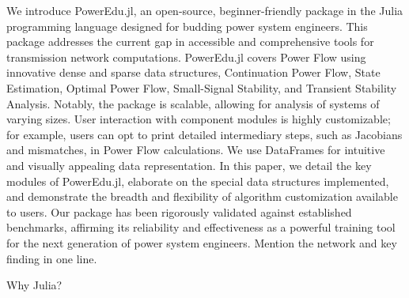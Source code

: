 \documentclass{article}
\begin{document}
    We introduce PowerEdu.jl, an open-source, beginner-friendly package in the Julia
    programming language designed for budding power system engineers. This package 
    addresses the current gap in accessible and comprehensive tools for transmission network
    computations. PowerEdu.jl covers Power Flow using innovative dense 
    and sparse data structures, Continuation Power Flow, State Estimation, Optimal 
    Power Flow, Small-Signal Stability, and Transient Stability Analysis. Notably, 
    the package is scalable, allowing for analysis of systems of varying 
    sizes. User interaction with component modules is highly customizable; for example, 
    users can opt to print detailed intermediary steps, such as Jacobians and mismatches, 
    in Power Flow calculations. We use DataFrames for intuitive and visually 
    appealing data representation. In this paper, we detail the key modules of 
    PowerEdu.jl, elaborate on the special data structures implemented, and demonstrate 
    the breadth and flexibility of algorithm customization available to users. Our 
    package has been rigorously validated against established benchmarks, affirming 
    its reliability and effectiveness as a powerful training tool for the next generation 
    of power system engineers. Mention the network and key finding in one line.

    Why Julia?
\end{document}
